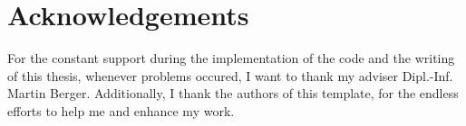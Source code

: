 \newpage
\chapter*{Acknowledgements}
For the constant support during the implementation of the code and the writing of this thesis, whenever problems occured, I want to thank my adviser Dipl.-Inf. Martin Berger. Additionally, I thank the authors of this template, for the endless efforts to help me and enhance my work.
